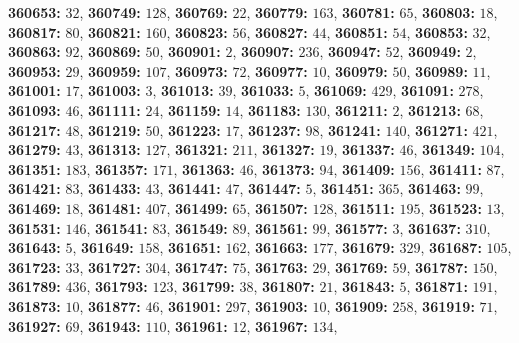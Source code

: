 \textsf{\bfseries 360653:} $32$, \textsf{\bfseries 360749:} $128$, \textsf{\bfseries 360769:} $22$, \textsf{\bfseries 360779:} $163$, \textsf{\bfseries 360781:} $65$, \textsf{\bfseries 360803:} $18$, \textsf{\bfseries 360817:} $80$, \textsf{\bfseries 360821:} $160$, \textsf{\bfseries 360823:} $56$, \textsf{\bfseries 360827:} $44$, \textsf{\bfseries 360851:} $54$, \textsf{\bfseries 360853:} $32$, \textsf{\bfseries 360863:} $92$, \textsf{\bfseries 360869:} $50$, \textsf{\bfseries 360901:} $2$, \textsf{\bfseries 360907:} $236$, \textsf{\bfseries 360947:} $52$, \textsf{\bfseries 360949:} $2$, \textsf{\bfseries 360953:} $29$, \textsf{\bfseries 360959:} $107$, \textsf{\bfseries 360973:} $72$, \textsf{\bfseries 360977:} $10$, \textsf{\bfseries 360979:} $50$, \textsf{\bfseries 360989:} $11$, \textsf{\bfseries 361001:} $17$, \textsf{\bfseries 361003:} $3$, \textsf{\bfseries 361013:} $39$, \textsf{\bfseries 361033:} $5$, \textsf{\bfseries 361069:} $429$, \textsf{\bfseries 361091:} $278$, \textsf{\bfseries 361093:} $46$, \textsf{\bfseries 361111:} $24$, \textsf{\bfseries 361159:} $14$, \textsf{\bfseries 361183:} $130$, \textsf{\bfseries 361211:} $2$, \textsf{\bfseries 361213:} $68$, \textsf{\bfseries 361217:} $48$, \textsf{\bfseries 361219:} $50$, \textsf{\bfseries 361223:} $17$, \textsf{\bfseries 361237:} $98$, \textsf{\bfseries 361241:} $140$, \textsf{\bfseries 361271:} $421$, \textsf{\bfseries 361279:} $43$, \textsf{\bfseries 361313:} $127$, \textsf{\bfseries 361321:} $211$, \textsf{\bfseries 361327:} $19$, \textsf{\bfseries 361337:} $46$, \textsf{\bfseries 361349:} $104$, \textsf{\bfseries 361351:} $183$, \textsf{\bfseries 361357:} $171$, \textsf{\bfseries 361363:} $46$, \textsf{\bfseries 361373:} $94$, \textsf{\bfseries 361409:} $156$, \textsf{\bfseries 361411:} $87$, \textsf{\bfseries 361421:} $83$, \textsf{\bfseries 361433:} $43$, \textsf{\bfseries 361441:} $47$, \textsf{\bfseries 361447:} $5$, \textsf{\bfseries 361451:} $365$, \textsf{\bfseries 361463:} $99$, \textsf{\bfseries 361469:} $18$, \textsf{\bfseries 361481:} $407$, \textsf{\bfseries 361499:} $65$, \textsf{\bfseries 361507:} $128$, \textsf{\bfseries 361511:} $195$, \textsf{\bfseries 361523:} $13$, \textsf{\bfseries 361531:} $146$, \textsf{\bfseries 361541:} $83$, \textsf{\bfseries 361549:} $89$, \textsf{\bfseries 361561:} $99$, \textsf{\bfseries 361577:} $3$, \textsf{\bfseries 361637:} $310$, \textsf{\bfseries 361643:} $5$, \textsf{\bfseries 361649:} $158$, \textsf{\bfseries 361651:} $162$, \textsf{\bfseries 361663:} $177$, \textsf{\bfseries 361679:} $329$, \textsf{\bfseries 361687:} $105$, \textsf{\bfseries 361723:} $33$, \textsf{\bfseries 361727:} $304$, \textsf{\bfseries 361747:} $75$, \textsf{\bfseries 361763:} $29$, \textsf{\bfseries 361769:} $59$, \textsf{\bfseries 361787:} $150$, \textsf{\bfseries 361789:} $436$, \textsf{\bfseries 361793:} $123$, \textsf{\bfseries 361799:} $38$, \textsf{\bfseries 361807:} $21$, \textsf{\bfseries 361843:} $5$, \textsf{\bfseries 361871:} $191$, \textsf{\bfseries 361873:} $10$, \textsf{\bfseries 361877:} $46$, \textsf{\bfseries 361901:} $297$, \textsf{\bfseries 361903:} $10$, \textsf{\bfseries 361909:} $258$, \textsf{\bfseries 361919:} $71$, \textsf{\bfseries 361927:} $69$, \textsf{\bfseries 361943:} $110$, \textsf{\bfseries 361961:} $12$, \textsf{\bfseries 361967:} $134$, 
